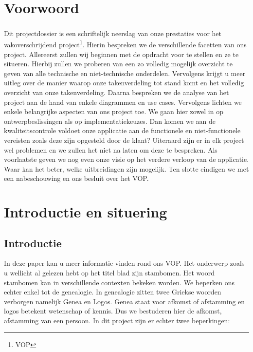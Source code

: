 \documentclass[pdftex,a4paper,12pt,twoside]{report}
\begin{document}
\tableofcontents

\chapter{Voorwoord}\label{ch:preface}

\paragraph{}
Dit projectdossier is een schriftelijk neerslag van onze prestaties voor het vakoverschrijdend project\footnote{VOP}. Hierin bespreken we de verschillende facetten van ons project. 
Allereerst zullen wij beginnen met de opdracht voor te stellen en ze te situeren. Hierbij zullen we proberen van een zo volledig mogelijk overzicht te geven van alle technische en niet-technische onderdelen. Vervolgens krijgt u meer uitleg over de manier waarop onze takenverdeling tot stand komt en het volledig overzicht van onze takenverdeling.
Daarna bespreken we de analyse van het project aan de hand van enkele diagrammen en use cases. Vervolgens lichten we enkele belangrijke aspecten van ons project toe. We gaan hier zowel in op ontwerpbeslissingen als op implementatiekeuzes. Dan komen we aan de kwaliteitscontrole voldoet onze applicatie aan de functionele en niet-functionele vereisten zoals deze zijn opgesteld door de klant? Uiteraard zijn er in elk project wel problemen en we zullen het niet na laten om deze te bespreken. Als voorlaatste geven we nog even onze visie op het verdere verloop van de applicatie. Waar kan het beter, welke uitbreidingen zijn mogelijk. Ten slotte eindigen we met een nabeschouwing en ons besluit over het VOP.
\chapter{Introductie en situering}\label{ch:introduction}

\section{Introductie}
In deze paper kan u meer informatie vinden rond ons VOP. Het onderwerp zoals u wellicht al gelezen hebt op het titel blad zijn stambomen. Het woord stambomen kan in verschillende contexten bekeken worden. We beperken ons echter enkel tot de genealogie. In genealogie zitten twee Griekse woorden verborgen namelijk Genea en Logos. Genea staat voor afkomst of afstamming en logos betekent wetenschap of kennis. 
Dus we bestuderen hier de afkomst, afstamming van een persoon.
In dit project zijn er echter twee beperkingen:
\end{document}
